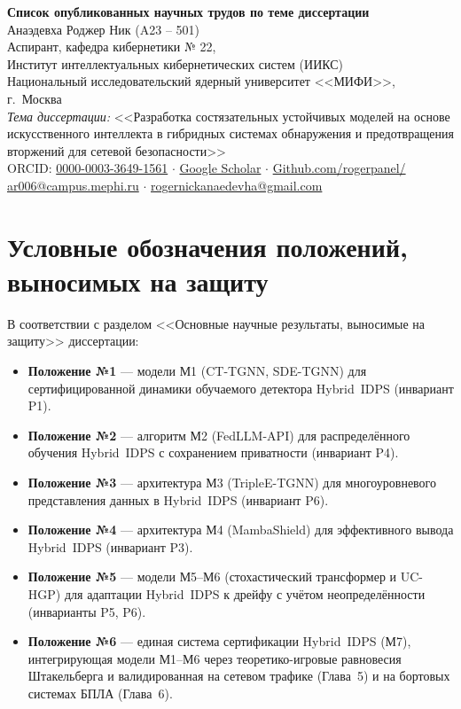 \documentclass[11pt,a4paper]{article}
\begin{document}
\begin{center}
{\LARGE \textbf{Список опубликованных научных трудов по теме диссертации}}\\[0.4em]
{\large Анаэдевха Роджер Ник (A23 -- 501)}\\[0.3em]
Аспирант, кафедра кибернетики № 22, \\ Институт интеллектуальных кибернетических систем (ИИКС)\\
Национальный исследовательский ядерный университет <<МИФИ>>, г.~Москва\\[0.3em]
\textit{Тема диссертации:} <<Разработка состязательных устойчивых моделей на основе искусственного интеллекта в гибридных системах обнаружения и предотвращения вторжений для сетевой безопасности>>\\[0.3em]
ORCID: \href{https://orcid.org/0000-0003-3649-1561}{0000-0003-3649-1561} ${\cdot}$
\href{https://scholar.google.com/citations?user=w6ryqsEAAAAJ&hl=en}{Google Scholar} ${\cdot}$
\href{https://github.com/rogerpanel/}{Github.com/rogerpanel/}\\
\href{mailto:ar006@campus.mephi.ru}{ar006@campus.mephi.ru} ${\cdot}$ \href{mailto:rogernickanaedevha@gmail.com}{rogernickanaedevha@gmail.com}
\end{center}

\vspace{-0.4cm}

\section*{Условные обозначения положений, выносимых на защиту}

В соответствии с разделом <<Основные научные результаты, выносимые на защиту>> диссертации:

\begin{itemize}[leftmargin=2em, itemsep=0.1em]
  \item \textbf{Положение №1} --- модели М1 (CT-TGNN, SDE-TGNN) для сертифицированной динамики обучаемого детектора Hybrid~IDPS (инвариант P1).
  \item \textbf{Положение №2} --- алгоритм М2 (FedLLM-API) для распределённого обучения Hybrid~IDPS с сохранением приватности (инвариант P4).
  \item \textbf{Положение №3} --- архитектура М3 (TripleE-TGNN) для многоуровневого представления данных в Hybrid~IDPS (инвариант P6).
  \item \textbf{Положение №4} --- архитектура М4 (MambaShield) для эффективного вывода Hybrid~IDPS (инвариант P3).
  \item \textbf{Положение №5} --- модели М5--М6 (стохастический трансформер и UC-HGP) для адаптации Hybrid~IDPS к дрейфу с учётом неопределённости (инварианты P5, P6).
  \item \textbf{Положение №6} --- единая система сертификации Hybrid~IDPS (М7), интегрирующая модели М1--М6 через теоретико-игровые равновесия Штакельберга и валидированная на сетевом трафике (Глава~5) и на бортовых системах БПЛА (Глава~6).
\end{itemize}
\end{document}
